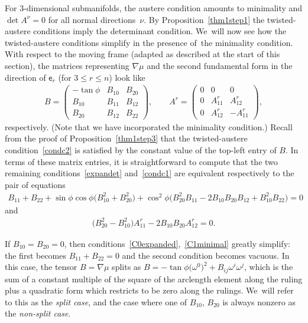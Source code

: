 \documentclass[10pt,a4paper]{amsart}
\def\ve{\mathsf{e}}
\numberwithin{equation}{section}
\begin{document}
For 3-dimensional submanifolds, the austere condition amounts to minimality and \mbox{$\det A^\nu =0$} for all normal directions~$\nu$. By Proposition~\ref{thm1step1} the twisted-austere conditions imply the determinant condition. We~will now see how the twisted-austere conditions simplify in the presence of~the minimality condition. With respect to the moving frame (adapted as described at the start of this section), the matrices representing $\nabla \mu$ and the second fundamental form in the direction of $\ve_r$ (for $3 \le r \le n$) look like
\begin{gather} \label{austereABform}
B=\begin{pmatrix} -\tan \phi & B_{10} & B_{20} \\ B_{10} & B_{11} & B_{12} \\ B_{20} & B_{12} & B_{22} \end{pmatrix} , \qquad
A^r = \begin{pmatrix} 0 & 0 & 0 \\ 0 & A^r_{11} & A^r_{12} \\ 0 & A^r_{12} & -A^r_{11} \end{pmatrix} ,
\end{gather}
respectively. (Note that we have incorporated the minimality condition.) Recall from the proof of Proposition~\ref{thm1step3} that the twisted-austere condition~\eqref{condc2} is satisfied by the constant value of the top-left entry of $B$. In terms of these matrix entries, it is straightforward to compute that the two remaining conditions~\eqref{expandet} and~\eqref{condc1} are equivalent respectively to the pair of equations
\begin{gather} \label{C0expanded}B_{11}+B_{22} + \sin\phi \cos\phi \big(B_{10}^2 + B_{20}^2\big) + \cos^2\phi \big( B_{20}^2 B_{11} -2B_{10}B_{20} B_{12} + B_{10}^2 B_{22}\big)=0
\end{gather}
and
\begin{gather} \label{C1minimal}
\big(B_{20}^2 -B_{10}^2\big) A^r_{11} -2B_{10}B_{20} A^r_{12} =0.
\end{gather}

If $B_{10}=B_{20}=0$, then conditions~\eqref{C0expanded},~\eqref{C1minimal} greatly simplify: the first becomes $B_{11}+B_{22}=0$ and the second condition becomes vacuous. In this case, the tensor $B=\nabla \mu$ splits as \mbox{$B = - \tan \phi \big(\omega^0\big)^2 + B_{ij} \omega^i \omega^j$}, which is the sum of a constant multiple of the square of the arclength element along the ruling plus a quadratic form which restricts to be zero along the rulings. We~will refer to this as the \emph{split case}, and the case where one of $B_{10}$, $B_{20}$ is always nonzero as the \emph{non-split case}.
\end{document}
